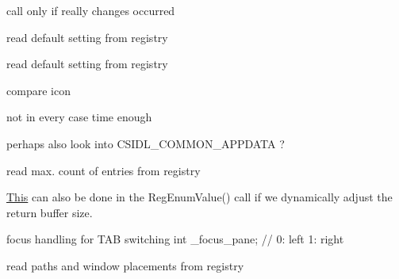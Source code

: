 \begin{DoxyRefList}
call only if really changes occurred  
\item[\label{todo__todo000073}%
\Hypertarget{todo__todo000073}%
成员 \hyperlink{struct_notify_area_a8971bf38f7f751fb5e428692ae98d7bd}{Notify\+Area\+:\+:read\+\_\+config} ()]read default setting from registry 

read default setting from registry  
\item[\label{todo__todo000072}%
\Hypertarget{todo__todo000072}%
成员 \hyperlink{struct_notify_info_a9dfae22d6f7f370c07ee6d62ba800f83}{Notify\+Info\+:\+:modify} (N\+O\+T\+I\+F\+Y\+I\+C\+O\+N\+D\+A\+TA $\ast$pnid)]compare icon  
\item[\label{todo__todo000042}%
\Hypertarget{todo__todo000042}%
成员 \hyperlink{struct_pane_a75554c9e14ed5de1efc75a5e9da6b6b9}{Pane\+:\+:draw\+\_\+item} (L\+P\+D\+R\+A\+W\+I\+T\+E\+M\+S\+T\+R\+U\+CT dis, \hyperlink{struct_entry}{Entry} $\ast$entry, int calc\+Width\+Col=-\/1)]not in every case time enough  
\item[\label{todo__todo000060}%
\Hypertarget{todo__todo000060}%
成员 \hyperlink{struct_quick_launch_bar_a47e0d543d791eb4069ef3133a146c3cb}{Quick\+Launch\+Bar\+:\+:Add\+Shortcuts} ()]perhaps also look into C\+S\+I\+D\+L\+\_\+\+C\+O\+M\+M\+O\+N\+\_\+\+A\+P\+P\+D\+A\+TA ?  
\item[\label{todo__todo000071}%
\Hypertarget{todo__todo000071}%
成员 \hyperlink{struct_recent_start_menu_a18e48b314b1c1f302f917b9e5e9801f4}{Recent\+Start\+Menu\+:\+:Add\+Entries} ()]read max. count of entries from registry  
\item[\label{todo__todo000043}%
\Hypertarget{todo__todo000043}%
成员 \hyperlink{struct_reg_directory_a48c2c8255423b0bcaca17bbb2fda20b0}{Reg\+Directory\+:\+:read\+\_\+directory} (int scan\+\_\+flags=0)]\hyperlink{namespace_this}{This} can also be done in the Reg\+Enum\+Value() call if we dynamically adjust the return buffer size.  
\item[\label{todo__todo000041}%
\Hypertarget{todo__todo000041}%
成员 \hyperlink{struct_s_d_i_main_frame_ab5627e9d93b8557c6ead9de6a98c845b}{S\+D\+I\+Main\+Frame\+:\+:\+\_\+split\+\_\+pos} ]focus handling for T\+AB switching int \+\_\+focus\+\_\+pane; // 0\+: left 1\+: right  
\item[\label{todo__todo000039}%
\Hypertarget{todo__todo000039}%
成员 \hyperlink{struct_s_d_i_main_frame_ad46e76e9bcc00352bba90e9eb5cdf5a2}{S\+D\+I\+Main\+Frame\+:\+:Wnd\+Proc} (U\+I\+NT nmsg, W\+P\+A\+R\+AM wparam, L\+P\+A\+R\+AM lparam)]read paths and window placements from registry 


\end{DoxyRefList}
